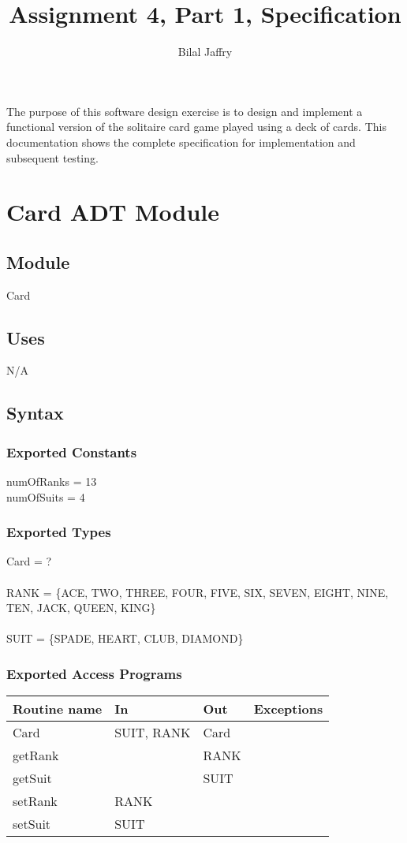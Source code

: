 \documentclass[12pt]{article}
\title{Assignment 4, Part 1, Specification}
\author{Bilal Jaffry}
\begin{document}
\maketitle

The purpose of this software design exercise is to design and implement a functional 
version of the solitaire card game played using a deck of cards. This documentation shows the complete specification for implementation and subsequent testing. 

\newpage

\section* {Card  ADT Module}

\subsection*{Module}

Card

\subsection* {Uses}

N/A

\subsection* {Syntax}

\subsubsection* {Exported Constants}
numOfRanks = 13\\
numOfSuits = 4

\subsubsection* {Exported Types}
Card = ?\\\\
RANK = \{ACE, TWO, THREE, FOUR, FIVE, SIX, SEVEN, EIGHT, NINE, TEN, JACK, QUEEN, KING\}\\ \\
SUIT = \{SPADE, HEART, CLUB, DIAMOND\}

\subsubsection* {Exported Access Programs}
\begin{tabular}{| l | l | l | l |}
\hline
\textbf{Routine name} & \textbf{In} & \textbf{Out} & \textbf{Exceptions}\\
\hline
Card &  SUIT, RANK & Card &\\
\hline
getRank & ~ & RANK & \\
\hline
getSuit& ~ & SUIT & \\
\hline
setRank & RANK  &~   & \\
\hline
setSuit& SUIT &~   &\\
\hline
\end{tabular}
\end{document}

